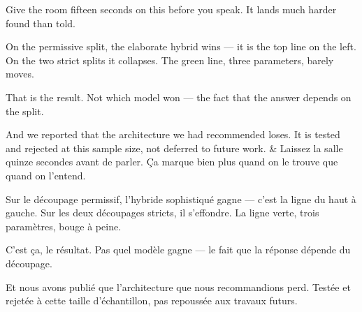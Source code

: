 \documentclass[10pt,a4paper]{article}
\begin{document}
\begin{say}
Give the room fifteen seconds on this before you speak. It lands much harder
found than told.

 On the permissive split, the elaborate hybrid wins
--- it is the top line on the left. On the two strict splits it collapses. The
green line, three parameters, barely moves.

 That is the result. Not which model won --- the fact that the
answer depends on the split.

And we reported that the architecture we had recommended loses. It is tested and
rejected at this sample size, not deferred to future work.
&
Laissez la salle quinze secondes avant de parler. Ça marque bien plus quand on le
trouve que quand on l'entend.

 Sur le découpage permissif,
l'hybride sophistiqué gagne --- c'est la ligne du haut à gauche. Sur les deux
découpages stricts, il s'effondre. La ligne verte, trois paramètres, bouge à
peine.

 C'est ça, le résultat. Pas quel modèle gagne --- le fait
que la réponse dépende du découpage.

Et nous avons publié que l'architecture que nous recommandions perd. Testée et
rejetée à cette taille d'échantillon, pas repoussée aux travaux futurs.
\end{say}
\end{document}
